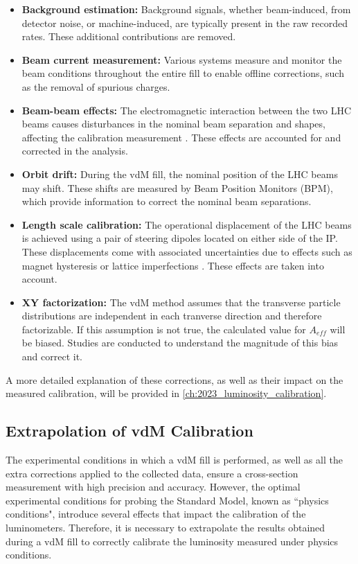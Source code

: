 {\begin{itemize}
    \item \textbf{Background estimation:} Background signals, whether beam-induced, from detector noise, or machine-induced, are typically present in the raw recorded rates. These additional contributions are removed.
    \item \textbf{Beam current measurement:} Various systems measure and monitor the beam conditions throughout the entire fill to enable offline corrections, such as the removal of spurious charges.
    \item \textbf{Beam-beam effects:} The electromagnetic interaction between the two LHC beams causes disturbances in the nominal beam separation and shapes, affecting the calibration measurement \cite{Babaev2024}. These effects are accounted for and corrected in the analysis.
    \item \textbf{Orbit drift:} During the vdM fill, the nominal position of the LHC beams may shift. These shifts are measured by Beam Position Monitors (BPM), which provide information to correct the nominal beam separations.
    \item \textbf{Length scale calibration:} The operational displacement of the LHC beams is achieved using a pair of steering dipoles located on either side of the IP. These displacements come with associated uncertainties due to effects such as magnet hysteresis or lattice imperfections \cite{Persson:2750277}. These effects are taken into account.
    \item \textbf{XY factorization:} The vdM method assumes that the transverse particle distributions are independent in each tranverse direction and therefore factorizable. If this assumption is not true, the calculated value for \(A_{eff}\) will be biased. Studies are conducted to understand the magnitude of this bias and correct it.
\end{itemize}

A more detailed explanation of these corrections, as well as their impact on the measured calibration, will be provided in \autoref{ch:2023_luminosity_calibration}.

\subsection{Extrapolation of vdM Calibration}
\label{subsec:extrapolation_of_vdM_calibration}

The experimental conditions in which a vdM fill is performed, as well as all the extra corrections applied to the collected data, ensure a cross-section measurement with high precision and accuracy. However, the optimal experimental conditions for probing the Standard Model, known as ``physics conditions", introduce several effects that impact the calibration of the luminometers. Therefore, it is necessary to extrapolate the results obtained during a vdM fill to correctly calibrate the luminosity measured under physics conditions.

}
